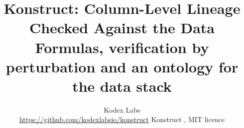 \documentclass[10pt,twocolumn,a4paper]{article}
\title{\textbf{Konstruct: Column-Level Lineage Checked Against the Data}\\[0.4ex]
  \large Formulas, verification by perturbation and an ontology for the data stack}
\author{Kodex Labs\\
  \small\url{https://github.com/kodexlabsio/konstruct}\quad
  \small Konstruct \konstructVersion{}, MIT licence}
\date{}
\begin{document}
\maketitle










\small
\raggedright


\end{document}
